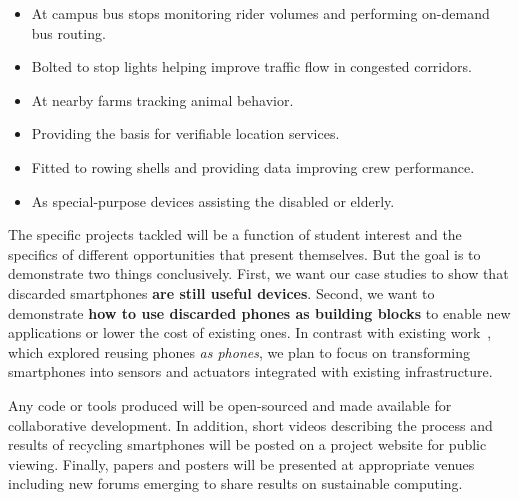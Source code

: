\begin{itemize}

\item At campus bus stops monitoring rider volumes and performing on-demand
bus routing.


\item Bolted to stop lights helping improve traffic flow in congested
corridors.


\item At nearby farms tracking animal behavior.

\item Providing the basis for verifiable location services.

\item Fitted to rowing shells and providing data improving crew performance.


\item As special-purpose devices assisting the disabled or elderly.

\end{itemize}

The specific projects tackled will be a function of student interest and the
specifics of different opportunities that present themselves. But the goal is
to demonstrate two things conclusively. First, we want our case studies to
show that discarded smartphones \textbf{are still useful devices}. Second, we
want to demonstrate \textbf{how to use discarded phones as building blocks}
to enable new applications or lower the cost of existing ones. In contrast
with existing work~\cite{li-smartphonereuse}, which explored reusing phones
\textit{as phones}, we plan to focus on transforming smartphones into sensors
and actuators integrated with existing infrastructure.

Any code or tools produced will be open-sourced and made available for
collaborative development. In addition, short videos describing the process
and results of recycling smartphones will be posted on a project website for
public viewing. Finally, papers and posters will be presented at appropriate
venues including new forums emerging to share results on sustainable
computing.
